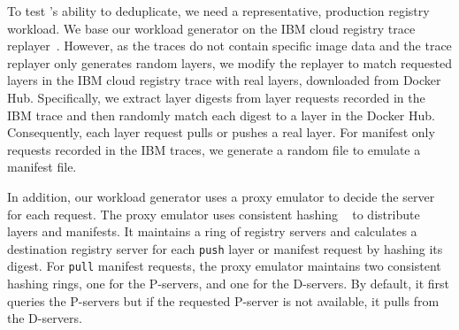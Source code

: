 To test \sysname{}'s ability to deduplicate, we need a representative, production
registry workload.
%
We base our workload generator on the IBM cloud registry trace replayer~\cite{dockerworkload}.
%
However, as the traces do not contain specific image data and the trace
replayer only generates random layers, we modify the replayer
to match requested layers in the IBM cloud registry trace with
real layers, downloaded from Docker Hub.
%
Specifically, we extract layer digests from layer requests recorded in the IBM trace
and then randomly match each digest to a layer in the Docker Hub.
Consequently, each layer request pulls or pushes a real layer.
%
For manifest only requests recorded in the IBM traces, we generate a random file to emulate a
manifest file.

In addition, our workload generator uses a proxy emulator to decide
the server for each request.
%
The proxy emulator uses
consistent hashing ~\cite{kargercons} to distribute layers and manifests.
%
It maintains a ring of registry servers
and calculates a destination registry server for each \texttt{push} layer or manifest request
by hashing its digest.
%
For \texttt{pull} manifest requests, the proxy emulator maintains two consistent hashing rings,
one for the P-servers, and one for the D-servers.
%
By default, it first queries the P-servers but if the requested P-server is not available,
it pulls from the D-servers.

